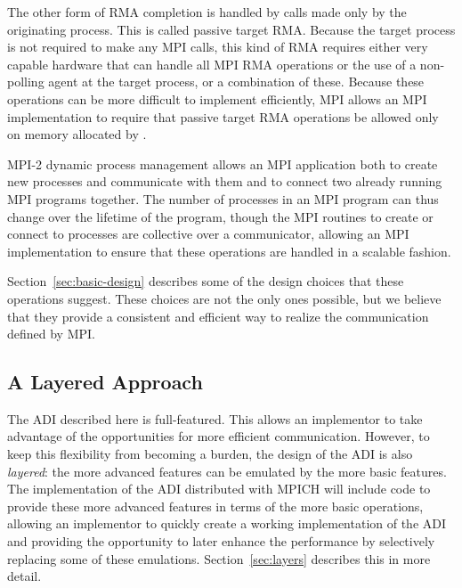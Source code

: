 The other form of RMA completion is handled by calls made only by the
originating process.  This is called passive target RMA.  Because the
target process is not required to make any MPI calls, this kind of RMA
requires either very capable hardware that can handle all MPI RMA
operations or the use of a non-polling agent at the target process, or a
combination of these.
Because these operations can be more difficult to implement
efficiently, MPI allows an MPI implementation to require that passive
target RMA operations be allowed only on memory allocated by
.  

MPI-2 dynamic process management allows an MPI application both to
create new processes and communicate with them and to connect two
already running MPI programs together.  The number of processes in an
MPI program can thus change over the lifetime of the program, though
the MPI routines to create or connect to processes are collective over
a communicator, allowing an MPI implementation to ensure that these
operations are handled in a scalable fashion.

Section~\ref{sec:basic-design} describes some of the design choices that these
operations suggest.  These choices are not the only ones possible, but
we believe that they provide a consistent and efficient way to realize
the communication defined by MPI.

\subsection{A Layered Approach}
The ADI described here is full-featured.  This allows an implementor
to take advantage of the opportunities for more efficient
communication.  However, to keep this flexibility from becoming a
burden, the design of the ADI is also \emph{layered}: the more
advanced features can be emulated by the more basic features.  The
implementation of the ADI distributed with MPICH will include code to
provide these more advanced features in terms of the more basic
operations, allowing an implementor to quickly create a working
implementation of the ADI and providing the opportunity to later
enhance the performance by selectively replacing some of these
emulations.  Section~\ref{sec:layers} describes this in more detail.

